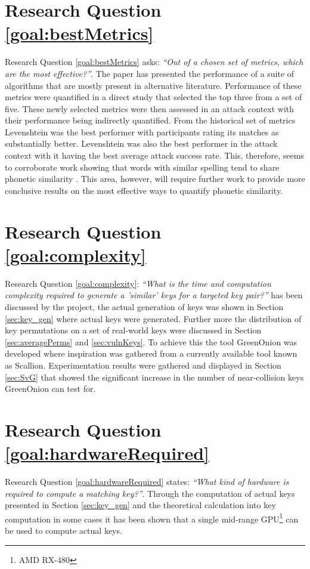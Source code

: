 \section{Research Question \ref{goal:bestMetrics}}
Research Question \ref{goal:bestMetrics} asks: \textit{``Out of a chosen set of metrics, which are the most effective?''}. 
The paper has presented the performance of a suite of algorithms that are mostly present in alternative literature. Performance of these metrics were quantified in a direct study that selected the top three from a set of five. These newly selected metrics were then assessed in an attack context with their performance being indirectly quantified. From the historical set of metrics Levenshtein was the best performer with participants rating its matches as substantially better. Levenshtein was also the best performer in the attack context with it having the best average attack success rate. This, therefore, seems to corroborate work showing that words with similar spelling tend to share phonetic similarity \cite{hettiarachchi2012sparcl}. This area, however, will require further work to provide more conclusive results on the most effective ways to quantify phonetic similarity.

\section{Research Question \ref{goal:complexity}}
Research Question \ref{goal:complexity}: \textit{``What is the time and computation complexity required to generate a ’similar’ keys for a targeted key pair?''} has been discussed by the project, the actual generation of keys was shown in Section \ref{sec:key_gen} where actual keys were generated. Further more the distribution of key permutations on a set of real-world keys were discussed in Section \ref{sec:averagePerms} and \ref{sec:vulnKeys}. To achieve this the tool GreenOnion was developed where inspiration was gathered from a currently available tool known as Scallion. Experimentation results were gathered and displayed in Section \ref{sec:SvG} that showed the significant increase in the number of near-collision keys GreenOnion can test for.


\section{Research Question \ref{goal:hardwareRequired}}
Research Question \ref{goal:hardwareRequired} states: \textit{``What kind of hardware is required to compute a matching key?''}. Through the computation of actual keys presented in Section \ref{sec:key_gen} and the theoretical calculation into key computation in some cases it has been shown that a single mid-range GPU\footnote{AMD RX-480} can be used to compute actual keys.

